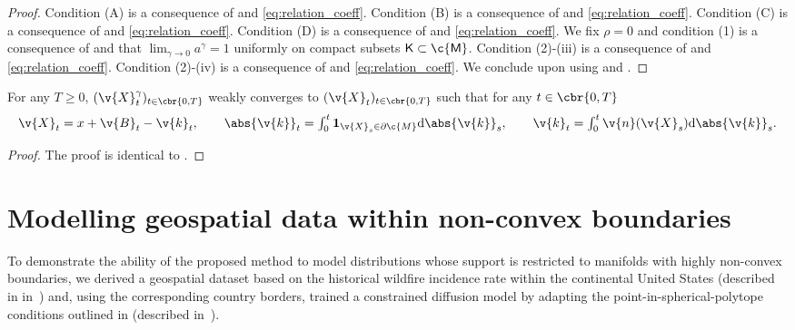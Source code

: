 \begin{proof}
	Condition (A) \cite[p.197]{stroock1971diffusion} is a consequence of  and \eqref{eq:relation_coeff}.
	Condition (B) \cite[p.197]{stroock1971diffusion} is a consequence of  and \eqref{eq:relation_coeff}.
	Condition (C) \cite[p.198]{stroock1971diffusion} is a consequence of  and \eqref{eq:relation_coeff}.
	Condition (D) \cite[p.198]{stroock1971diffusion} is a consequence of  and \eqref{eq:relation_coeff}.
	We fix $\rho =0$ and condition (1) \cite[p.203]{stroock1971diffusion} is a consequence of  and that $\lim_{\gamma \to 0} a^\gamma = 1$ uniformly on compact subsets $\sf{K} \subset \c{M}$.
	Condition (2)-(iii) \cite[p.203]{stroock1971diffusion} is a consequence of  and \eqref{eq:relation_coeff}.
	Condition (2)-(iv) \cite[p.203]{stroock1971diffusion} is a consequence of  and \eqref{eq:relation_coeff}.
	We conclude upon using \cite[Theorem 6.3]{stroock1971diffusion} and \cite[Theorem 5.8]{stroock1971diffusion}.
\end{proof}

\begin{theorem}
	\label{thm:subm-probl-weak-lazy}
	For any $T \geq 0$, $(\v{X}_t^\gamma)_{t \in \cbr{0,T}}$ weakly converges to $(\v{X}_t)_{t \in \cbr{0,T}}$ such that for any $t \in \cbr{0,T}$ \begin{equation} \textstyle \v{X}_t = x + \v{B}_t - \v{k}_t , \qquad \abs{\v{k}}_t = \int_0^t \bm{1}_{\v{X}_s \in \partial \c{M}} \mathrm{d} \abs{\v{k}}_s , \qquad \v{k}_t = \int_0^t \v{n}(\v{X}_s) \mathrm{d} \abs{\v{k}}_s .
	\end{equation}
\end{theorem}

\begin{proof}
	The proof is identical to .
\end{proof}

\section{Modelling geospatial data within non-convex boundaries}
\label{app_sec:wildfire_data}

To demonstrate the ability of the proposed method to model distributions whose support is restricted to manifolds with highly non-convex boundaries, we derived a geospatial dataset based on the historical wildfire incidence rate within the continental United States (described in in~) and, using the corresponding country borders, trained a constrained diffusion model by adapting the point-in-spherical-polytope conditions outlined in \cite{ketzner2022robust} (described in~).

